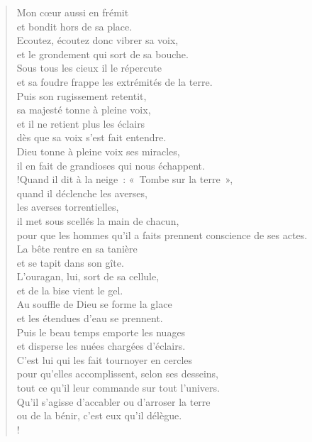 \documentclass[french,twoside]{book} %
\def\mednobreak{\ifdim\lastskip<\medskipamount
  \removelastskip\nopagebreak\medskip\fi}
\newcommand{\labelblock}[1]{\medbreak{\noindent\color{rubric}\bfseries #1}\par\mednobreak}
\begin{document}
\begin{verse}
Mon cœur aussi en frémit \\
et bondit hors de sa place.\\
Ecoutez, écoutez donc vibrer sa voix, \\
et le grondement qui sort de sa bouche.\\
Sous tous les cieux il le répercute \\
et sa foudre frappe les extrémités de la terre.\\
Puis son rugissement retentit, \\
sa majesté tonne à pleine voix, \\
et il ne retient plus les éclairs \\
dès que sa voix s’est fait entendre.\\
Dieu tonne à pleine voix ses miracles, \\
il en fait de grandioses qui nous échappent.\\!Quand il dit à la neige : « Tombe sur la terre », \\
quand il déclenche les averses, \\
les averses torrentielles,\\
il met sous scellés la main de chacun, \\
pour que les hommes qu’il a faits prennent conscience de ses actes.\\
La bête rentre en sa tanière \\
et se tapit dans son gîte.\\
L’ouragan, lui, sort de sa cellule, \\
et de la bise vient le gel.\\
Au souffle de Dieu se forme la glace \\
et les étendues d’eau se prennent.\\
Puis le beau temps emporte les nuages \\
et disperse les nuées chargées d’éclairs.\\
C’est lui qui les fait tournoyer en cercles \\
pour qu’elles accomplissent, selon ses desseins, \\
tout ce qu’il leur commande sur tout l’univers.\\
Qu’il s’agisse d’accabler ou d’arroser la terre \\
ou de la bénir, c’est eux qu’il délègue.\\!
\end{verse}

\labelblock{Le Seigneur de l’été}
\end{document}

